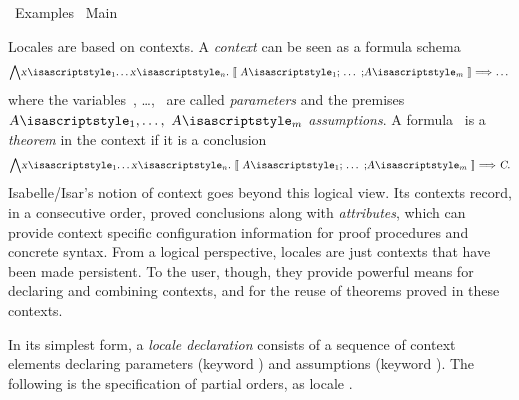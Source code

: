 %
\begin{isabellebody}%
\def\isabellecontext{Examples}%
%
\isadelimtheory
%
\endisadelimtheory
%
\isatagtheory
{}\isamarkupfalse%
\ Examples\isanewline
{}\ Main\isanewline
{}%
\endisatagtheory
{\isafoldtheory}%
%
\isadelimtheory
\isanewline
%
\endisadelimtheory
%
\isadeliminvisible
\isanewline
%
\endisadeliminvisible
%
\isataginvisible
{}\isamarkupfalse%
\ {}{}%
\endisataginvisible
{\isafoldinvisible}%
%
\isadeliminvisible
%
\endisadeliminvisible
%
\isamarkuptrue%
%
\begin{isamarkuptext}%
Locales are based on contexts.  A \emph{context} can be seen as a
  formula schema
\[
  \isa{{\isasymAnd}x\isactrlsub {\isadigit{1}}{\isasymdots}x\isactrlsub n{\isachardot}\ {\isasymlbrakk}\ A\isactrlsub {\isadigit{1}}{\isacharsemicolon}\ {\isasymdots}\ {\isacharsemicolon}A\isactrlsub m\ {\isasymrbrakk}\ {\isasymLongrightarrow}\ {\isasymdots}}
\]
  where the variables~, \ldots,~ are called
  \emph{parameters} and the premises $\isa{A\isactrlsub {\isadigit{1}}}, \ldots,~\isa{A\isactrlsub m}$ \emph{assumptions}.  A formula~
  is a \emph{theorem} in the context if it is a conclusion
\[
  \isa{{\isasymAnd}x\isactrlsub {\isadigit{1}}{\isasymdots}x\isactrlsub n{\isachardot}\ {\isasymlbrakk}\ A\isactrlsub {\isadigit{1}}{\isacharsemicolon}\ {\isasymdots}\ {\isacharsemicolon}A\isactrlsub m\ {\isasymrbrakk}\ {\isasymLongrightarrow}\ C}.
\]
  Isabelle/Isar's notion of context goes beyond this logical view.
  Its contexts record, in a consecutive order, proved
  conclusions along with \emph{attributes}, which can provide context
  specific configuration information for proof procedures and concrete
  syntax.  From a logical perspective, locales are just contexts that
  have been made persistent.  To the user, though, they provide
  powerful means for declaring and combining contexts, and for the
  reuse of theorems proved in these contexts.%
\end{isamarkuptext}%
\isamarkuptrue%
%
\isamarkuptrue%
%
\begin{isamarkuptext}%
In its simplest form, a
  \emph{locale declaration} consists of a sequence of context elements
  declaring parameters (keyword ) and assumptions
  (keyword ).  The following is the specification of
  partial orders, as locale .%

\end{isamarkuptext}
\end{isabellebody}
